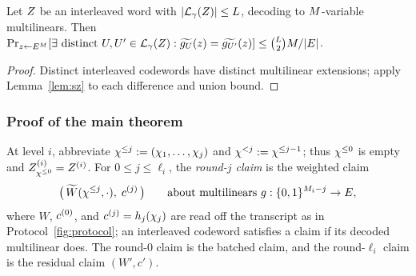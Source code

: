 \begin{lemma}\label{lem:ood}
Let $Z$ be an interleaved word with $|\mathcal{L}_\gamma(Z)| \le L$, decoding to $M$-variable multilinears. Then $\Pr_{z \leftarrow E^{M}}[\exists \text{ distinct } U, U' \in \mathcal{L}_\gamma(Z) : \widetilde{g_U}(z) = \widetilde{g_{U'}}(z)] \le \binom{L}{2} M / |E|$.
\end{lemma}

\begin{proof}
Distinct interleaved codewords have distinct multilinear extensions; apply Lemma~\ref{lem:sz} to each difference and union bound.
\end{proof}

\subsubsection{Proof of the main theorem}\label{pcs:proof}

At level $i$, abbreviate $\chi^{\le j} := (\chi_1, \dots, \chi_j)$ and $\chi^{<j} := \chi^{\le j-1}$; thus $\chi^{\le 0}$ is empty and $Z^{(i)}_{\chi^{\le 0}} = Z^{(i)}$. For $0 \le j \le \ell_i$, the \emph{round-$j$ claim} is the weighted claim
\[
\bigl(\, \widetilde{W}(\chi^{\le j}, \cdot),\; c^{(j)} \,\bigr) \qquad \text{about multilinears } g : \{0,1\}^{M_i - j} \to E,
\]
where $W$, $c^{(0)}$, and $c^{(j)} = h_j(\chi_j)$ are read off the transcript as in Protocol~\ref{fig:protocol}; an interleaved codeword satisfies a claim if its decoded multilinear does. The round-$0$ claim is the batched claim, and the round-$\ell_i$ claim is the residual claim $(W', c')$.

